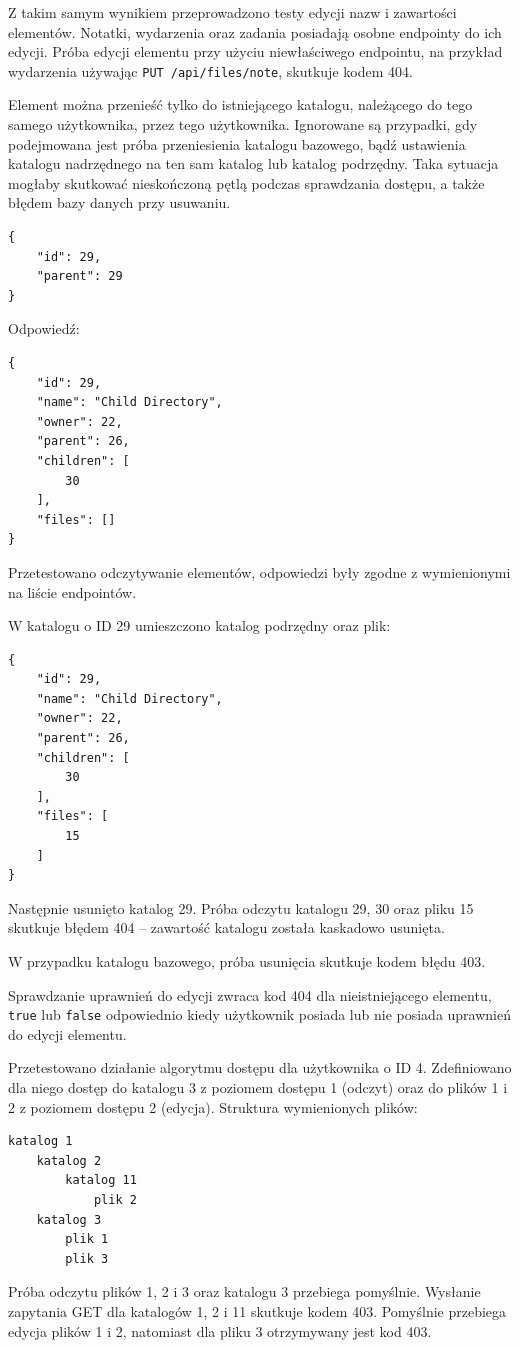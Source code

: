 \documentclass[a4paper,twoside,12pt]{book}
\begin{document}
Z takim samym wynikiem przeprowadzono testy edycji nazw i zawartości elementów. Notatki, wydarzenia oraz zadania posiadają osobne endpointy do ich edycji. Próba edycji elementu przy użyciu niewłaściwego endpointu, na przykład wydarzenia używając \texttt{PUT /api/files/note}, skutkuje kodem 404.

Element można przenieść tylko do istniejącego katalogu, należącego do tego samego użytkownika, przez tego użytkownika. Ignorowane są przypadki, gdy podejmowana jest próba przeniesienia katalogu bazowego, bądź ustawienia katalogu nadrzędnego na ten sam katalog lub katalog podrzędny. Taka sytuacja mogłaby skutkować nieskończoną pętlą podczas sprawdzania dostępu, a także błędem bazy danych przy usuwaniu.
\begin{verbatim}
{
	"id": 29,
	"parent": 29
}
\end{verbatim}
Odpowiedź:
\begin{verbatim}
{
	"id": 29,
	"name": "Child Directory",
	"owner": 22,
	"parent": 26,
	"children": [
		30
	],
	"files": []
}
\end{verbatim}

Przetestowano odczytywanie elementów, odpowiedzi były zgodne z wymienionymi na liście endpointów.

W katalogu o ID 29 umieszczono katalog podrzędny oraz plik:
\begin{verbatim}
{
	"id": 29,
	"name": "Child Directory",
	"owner": 22,
	"parent": 26,
	"children": [
		30
	],
	"files": [
		15
	]
}
\end{verbatim}
Następnie usunięto katalog 29. Próba odczytu katalogu 29, 30 oraz pliku 15 skutkuje błędem 404 -- zawartość katalogu została kaskadowo usunięta.

W przypadku katalogu bazowego, próba usunięcia skutkuje kodem błędu 403.

Sprawdzanie uprawnień do edycji zwraca kod 404 dla nieistniejącego elementu, \texttt{true} lub \texttt{false} odpowiednio kiedy użytkownik posiada lub nie posiada uprawnień do edycji elementu.

Przetestowano działanie algorytmu dostępu dla użytkownika o ID 4. Zdefiniowano dla niego dostęp do katalogu 3 z poziomem dostępu 1 (odczyt) oraz do plików 1 i 2 z poziomem dostępu 2 (edycja). Struktura wymienionych plików:
\begin{verbatim}
katalog 1
	katalog 2
		katalog 11
			plik 2
	katalog 3
		plik 1
		plik 3
\end{verbatim}
Próba odczytu plików 1, 2 i 3 oraz katalogu 3 przebiega pomyślnie. Wysłanie zapytania GET dla katalogów 1, 2 i 11 skutkuje kodem 403. Pomyślnie przebiega edycja plików 1 i 2, natomiast dla pliku 3 otrzymywany jest kod 403.
\end{document}

